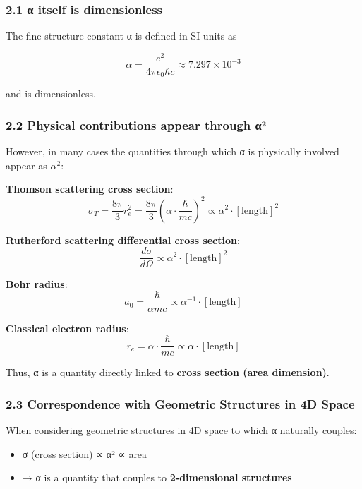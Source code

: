 \documentclass[
  11pt]{article}
\providecommand{\tightlist}{%
  \setlength{\itemsep}{0pt}\setlength{\parskip}{0pt}}
\begin{document}
\subsubsection{2.1 α itself is
dimensionless}\label{ux3b1-itself-is-dimensionless}

The fine-structure constant α is defined in SI units as

\[\alpha = \frac{e^2}{4\pi\epsilon_0 \hbar c} \approx 7.297 \times 10^{-3}\]

and is dimensionless.

\subsubsection{2.2 Physical contributions appear through
α²}\label{physical-contributions-appear-through-ux3b1uxb2}

However, in many cases the quantities through which α is physically
involved appear as \(\alpha^2\):

\textbf{Thomson scattering cross section}:
\[\sigma_T = \frac{8\pi}{3} r_e^2 = \frac{8\pi}{3} \left(\alpha \cdot \frac{\hbar}{mc}\right)^2 \propto \alpha^2 \cdot [\text{length}]^2\]

\textbf{Rutherford scattering differential cross section}:
\[\frac{d\sigma}{d\Omega} \propto \alpha^2 \cdot [\text{length}]^2\]

\textbf{Bohr radius}:
\[a_0 = \frac{\hbar}{\alpha mc} \propto \alpha^{-1} \cdot [\text{length}]\]

\textbf{Classical electron radius}:
\[r_e = \alpha \cdot \frac{\hbar}{mc} \propto \alpha \cdot [\text{length}]\]

Thus, α is a quantity directly linked to \textbf{cross section (area
dimension)}.

\subsubsection{2.3 Correspondence with Geometric Structures in 4D
Space}\label{correspondence-with-geometric-structures-in-4d-space}

When considering geometric structures in 4D space to which α naturally
couples:

\begin{itemize}
\tightlist
\item
  σ (cross section) ∝ α² ∝ area
\item
  → α is a quantity that couples to \textbf{2-dimensional structures}
\end{itemize}
\end{document}
